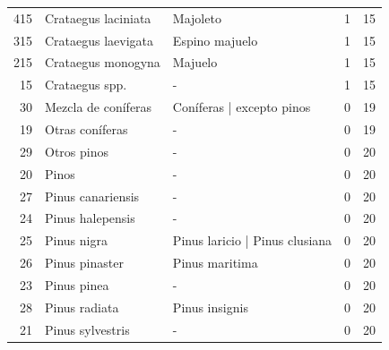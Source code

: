 \begin{longtable}{r p{4cm} p{5cm} c c}
    415           & Crataegus laciniata               & Majoleto                                      & 1             & 15             \\
    315           & Crataegus laevigata               & Espino majuelo                                & 1             & 15             \\
    215           & Crataegus monogyna                & Majuelo                                       & 1             & 15             \\
    15            & Crataegus spp.                    & -                                             & 1             & 15             \\
    30            & Mezcla de coníferas               & Coníferas | excepto pinos                     & 0             & 19             \\
    19            & Otras coníferas                   & -                                             & 0             & 19             \\
    29            & Otros pinos                       & -                                             & 0             & 20             \\
    20            & Pinos                             & -                                             & 0             & 20             \\
    27            & Pinus canariensis                 & -                                             & 0             & 20             \\
    24            & Pinus halepensis                  & -                                             & 0             & 20             \\
    25            & Pinus nigra                       & Pinus laricio | Pinus clusiana                & 0             & 20             \\
    26            & Pinus pinaster                    & Pinus maritima                                & 0             & 20             \\
    23            & Pinus pinea                       & -                                             & 0             & 20             \\
    28            & Pinus radiata                     & Pinus insignis                                & 0             & 20             \\
    21            & Pinus sylvestris                  & -                                             & 0             & 20             \\

\end{longtable}
